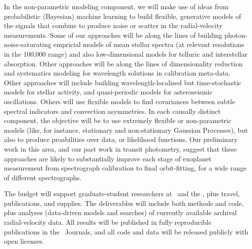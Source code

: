 \documentclass[12pt, fullpage, letterpaper]{article}
\begin{document}
In the non-parametric modeling component, we will make use of ideas
from probabilistic (Bayesian) machine learning to build flexible,
generative models of the signals that combine to produce noise or
scatter in the radial-velocity measurements. Some of our approaches
will be along the lines of building photon-noise-saturating empricial
models of mean stellar spectra (at relevant resolutions in the 100,000
range) and also low-dimensional models for telluric and interstellar
absorption. Other approaches will be along the lines of dimensionality
reduction and systematics modeling for wavelength solutions in
calibration meta-data. Other approaches will include building
wavelength-localized but time-stochastic models for stellar activity,
and quasi-periodic models for asteroseismic oscillations. Others will
use flexible models to find covariances between subtle spectral
indicators and convection asymmetries. In each causally distinct
component, the objective will be to use extremely flexible or
non-parametric models (like, for instance, stationary and
non-stationary Gaussian Processes), but also to produce proabilities
over data, or likelihood functions.  Our preliminary work in this
area, and our past work in transit photometry, suggest that these
approaches are likely to substantially improve each stage of exoplanet
measurement from spectrograph calibration to final orbit-fitting, for
a wide range of different spectrographs.

The budget will support graduate-student researchers at \NYU\ and the
\PI, plus travel, publications, and supplies. The deliverables will
include both methods and code, plus analyses (data-driven models and
searches) of currently available archival radial-velocity data. All
results will be published in fully reproducible publications in the
\AAS\ Journals, and all code and data will be released publicly with
open licenses.
\end{document}
